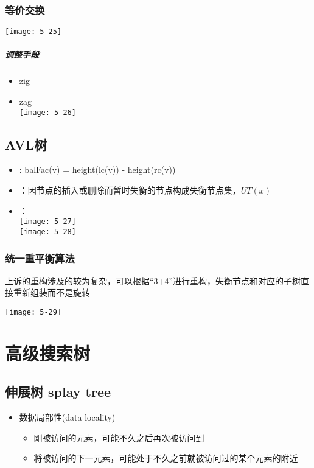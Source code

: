 \subsection{等价交换}
\texttt{[image: 5-25]}
\paragraph{调整手段}
\begin{itemize}
\item zig
\item zag\\
\texttt{[image: 5-26]}
\end{itemize}

\section{AVL树}
\begin{itemize}
\item {}: balFac(v) = height(lc(v)) - height(rc(v))
\item {}：因节点的插入或删除而暂时失衡的节点构成失衡节点集，$UT(x)$
\item {}：\\
\texttt{[image: 5-27]}\\
\texttt{[image: 5-28]}
\end{itemize}

\subsection{统一重平衡算法}
上诉的重构涉及的较为复杂，可以根据``3+4''进行重构，失衡节点和对应的子树直接重新组装而不是旋转

\texttt{[image: 5-29]}

\chapter{高级搜索树}
\section{伸展树 splay tree}
\begin{itemize}
\item 数据局部性(data locality)
\begin{itemize}
\item 刚被访问的元素，可能不久之后再次被访问到
\item 将被访问的下一元素，可能处于不久之前就被访问过的某个元素的附近
\end{itemize}
\end{itemize}
